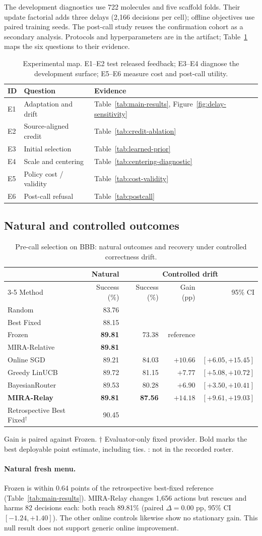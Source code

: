 \documentclass[sigconf,anonymous]{aamas}
\makeatletter
\newcommand{\MiraTableFont}{\fontsize{9}{11}\selectfont}
\newcommand{\tnote}[1]{{\fontsize{8.5}{10}\selectfont\raggedright\par\vspace{3pt}#1\par}}
\newcommand{\notrun}{\textemdash}
\newcommand{\MiraMainCaption}{Pre-call selection on BBB: natural outcomes and recovery under controlled correctness drift.}
\newcommand{\MiraMainLabels}{\label{tab:main-results}\label{tab:mechanism-results}}
\newcommand{\MiraMainBody}{%
\begingroup\centering\MiraTableFont\setlength{\tabcolsep}{11pt}\renewcommand{\arraystretch}{1.08}
\begin{tabular}{@{}lrrrr@{}}
\toprule
& Natural & \multicolumn{3}{c}{Controlled drift} \\
\cmidrule(l){3-5}
Method & Success (\%) & Success (\%) & Gain (pp) & 95\% CI \\
\midrule
Random & 83.76 & \notrun & \notrun & \notrun \\
Best Fixed & 88.15 & \notrun & \notrun & \notrun \\
Frozen & \textbf{89.81} & 73.38 & reference & \notrun \\
MIRA-Relative & \textbf{89.81} & \notrun & \notrun & \notrun \\
\midrule
Online SGD & 89.21 & 84.03 & $+10.66$ & $[+6.05,+15.45]$ \\
Greedy LinUCB & 89.72 & 81.15 & $+7.77$ & $[+5.08,+10.72]$ \\
BayesianRouter & 89.53 & 80.28 & $+6.90$ & $[+3.50,+10.41]$ \\
\midrule
\textbf{MIRA-Relay} & \textbf{89.81} & \textbf{87.56} & $+14.18$ & $[+9.61,+19.03]$ \\
\midrule
Retrospective Best Fixed$^{\dagger}$ & 90.45 & \notrun & \notrun & \notrun \\
\bottomrule
\end{tabular}\par
\tnote{Gain is paired against Frozen. $\dagger$ Evaluator-only fixed provider. Bold marks the best deployable point estimate, including ties. \notrun: not in the recorded roster.}
\endgroup}
\makeatother
\begin{document}
The development diagnostics use 722 molecules and five scaffold folds. Their update factorial adds three delays (2,166 decisions per cell); offline objectives use paired training seeds. The post-call study reuses the confirmation cohort as a secondary analysis. Protocols and hyperparameters are in the artifact; Table~\ref{tab:matrix} maps the six questions to their evidence.

\begin{table}[t]
\caption{Experimental map. E1--E2 test released feedback; E3--E4 diagnose the development surface; E5--E6 measure cost and post-call utility.}
\label{tab:matrix}
\MiraTableFont
\setlength{\tabcolsep}{3pt}
\begin{tabular}{@{}llp{}@{}}
\toprule
ID & Question & Evidence \\
\midrule
E1 & Adaptation and drift & Table~\ref{tab:main-results}, Figure~\ref{fig:delay-sensitivity} \\
E2 & Source-aligned credit & Table~\ref{tab:credit-ablation} \\
E3 & Initial selection & Table~\ref{tab:learned-prior} \\
E4 & Scale and centering & Table~\ref{tab:centering-diagnostic} \\
E5 & Policy cost / validity & Table~\ref{tab:cost-validity} \\
E6 & Post-call refusal & Table~\ref{tab:postcall} \\
\bottomrule
\end{tabular}
\end{table}

\subsection{Natural and controlled outcomes}
\begin{table}[t]
\caption{\MiraMainCaption}
\MiraMainLabels
\MiraMainBody
\end{table}

\paragraph{Natural fresh menu.} Frozen is within 0.64 points of the retrospective best-fixed reference (Table~\ref{tab:main-results}). MIRA-Relay changes 1,656 actions but rescues and harms 82 decisions each: both reach 89.81\% (paired $\Delta=0.00$ pp, 95\% CI $[-1.24,+1.40]$). The other online controls likewise show no stationary gain. This null result does not support generic online improvement.
\end{document}
